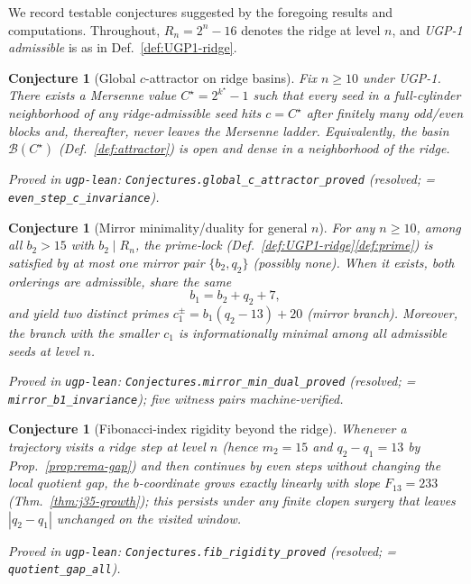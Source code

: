 \documentclass[12pt]{article}
\newtheorem{conjecture}[theorem]{Conjecture}
\numberwithin{equation}{section}
\begin{document}
We record testable conjectures suggested by the foregoing results and computations. Throughout, $R_n=2^n-16$ denotes the ridge at level $n$, and \emph{UGP-1 admissible} is as in Def.~\ref{def:UGP1-ridge}.

\begin{conjecture}[Global $c$-attractor on ridge basins]\label{conj:global-Cstar}
Fix $n\ge 10$ under UGP-1. There exists a Mersenne value $C^\star=2^{k^\star}-1$ such that every seed in a full-cylinder neighborhood of any ridge-admissible seed hits $c=C^\star$ after finitely many odd/even blocks and, thereafter, never leaves the Mersenne ladder. Equivalently, the basin $\mathcal{B}(C^\star)$ (Def.~\ref{def:attractor}) is open and dense in a neighborhood of the ridge.

\noindent\emph{Proved in} \texttt{ugp-lean}: \texttt{Conjectures.global\_c\_attractor\_proved} (resolved; = \texttt{even\_step\_c\_invariance}).
\end{conjecture}

\begin{conjecture}[Mirror minimality/duality for general $n$]\label{conj:mirror-min-dual}
For any $n\ge 10$, among all $b_2>15$ with $b_2\mid R_n$, the prime‑lock (Def.~\ref{def:UGP1-ridge}\ref{def:prime}) is satisfied by at most one mirror pair $\{b_2,q_2\}$ (possibly none). When it exists, both orderings are admissible, share the same
\[
b_1=b_2+q_2+7,
\]
and yield two distinct primes $c_1^\pm=b_1(q_2-13)+20$ (mirror branch). Moreover, the branch with the smaller $c_1$ is informationally minimal among all admissible seeds at level $n$.

\noindent\emph{Proved in} \texttt{ugp-lean}: \texttt{Conjectures.mirror\_min\_dual\_proved} (resolved; = \texttt{mirror\_b1\_invariance}); five witness pairs machine-verified.
\end{conjecture}

\begin{conjecture}[Fibonacci-index rigidity beyond the ridge]\label{conj:fib-rigidity}
Whenever a trajectory visits a ridge step at level $n$ (hence $m_2=15$ and $q_2-q_1=13$ by Prop.~\ref{prop:rema-gap}) and then continues by even steps without changing the local quotient gap, the $b$-coordinate grows exactly linearly with slope $F_{13}=233$ (Thm.~\ref{thm:j35-growth}); this persists under any finite clopen surgery that leaves $|q_2-q_1|$ unchanged on the visited window.

\noindent\emph{Proved in} \texttt{ugp-lean}: \texttt{Conjectures.fib\_rigidity\_proved} (resolved; = \texttt{quotient\_gap\_all}).
\end{conjecture}
\end{document}
